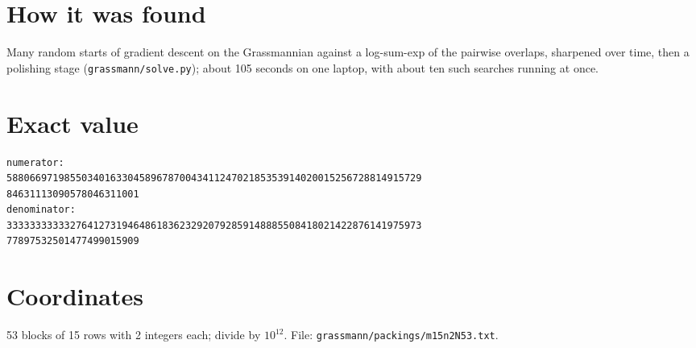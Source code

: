 \documentclass[11pt,a4paper]{article}
\begin{document}
\section{How it was found}
Many random starts of gradient descent on the Grassmannian against a log-sum-exp of the pairwise overlaps, sharpened over time, then a polishing stage (\texttt{grassmann/solve.py}); about 105 seconds on one laptop, with about ten such searches running at once.


\appendix
\section{Exact value}
{\small
\begin{verbatim}
numerator:
588066971985503401633045896787004341124702185353914020015256728814915729
84631113090578046311001
denominator:
333333333332764127319464861836232920792859148885508418021422876141975973
77897532501477499015909
\end{verbatim}}

\section{Coordinates}
53 blocks of 15 rows with 2 integers each; divide by $10^{12}$. File: \texttt{grassmann/packings/m15n2N53.txt}.
{\tiny
\begin{multicols}{4}
\end{multicols}}
\end{document}
